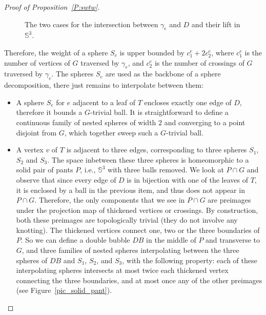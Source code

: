\documentclass[11pt,a4paper]{article}
\newcommand{\Sp}{\mathbb S}
\newcommand{\control}[2]{ ($#2+#1$) .. #1}
\begin{document}
\begin{proof}[Proof of Proposition~\ref{P:swtw}]
\begin{figure}[h]
\begin{center}
\caption{The two cases for the intersection between $\gamma_e$ and $D$ and their lift in $\Sp^3$.}
\label{pic_gamma_G}
\end{center}
\end{figure}

Therefore, the weight of a sphere $S_e$ is upper bounded by $c^e_1+2c^e_2$, where $c^e_1$ is the number of vertices of $G$ traversed by $\gamma_e$, and $c^e_2$ is the number of crossings of $G$ traversed by $\gamma_e$. The spheres $S_e$ are used as the backbone of a sphere decomposition, there just remains to interpolate between them:

  \begin{itemize}
\item A sphere $S_e$ for $e$ adjacent to a leaf of $T$ encloses exactly one edge of $D$, therefore it bounds a $G$-trivial ball. It is straightforward to define a continuous family of nested spheres of width $2$ and converging to a point disjoint from $G$, which together sweep such a $G$-trivial ball.
\item A vertex $v$ of $T$ is adjacent to three edges, corresponding to three spheres $S_{1}$, $S_{2}$ and $S_{3}$. The space inbetween these three spheres is homeomorphic to a solid pair of pants $P$, i.e., $\Sp^3$ with three balls removed. We look at $P \cap G$ and observe that since every edge of $D$ is in bijection with one of the leaves of $T$, it is enclosed by a ball in the previous item, and thus does not appear in $P\cap G$. Therefore, the only components that we see in $P\cap G$ are preimages under the projection map of thickened vertices or crossings. By construction, both these preimages are topologically trivial (they do not involve any knotting). The thickened vertices connect one, two or the three boundaries of $P$. So we can define a double bubble $DB$ in the middle of $P$ and transverse to $G$, and three families of nested spheres interpolating between the three spheres of $DB$ and $S_1$, $S_2$, and $S_3$, with the following property: each of these interpolating spheres intersects at most twice each thickened vertex connecting the three boundaries, and at most once any of the other preimages (see Figure~\ref{pic_solid_pant}). 
  \end{itemize}


\end{proof}
\end{document}

